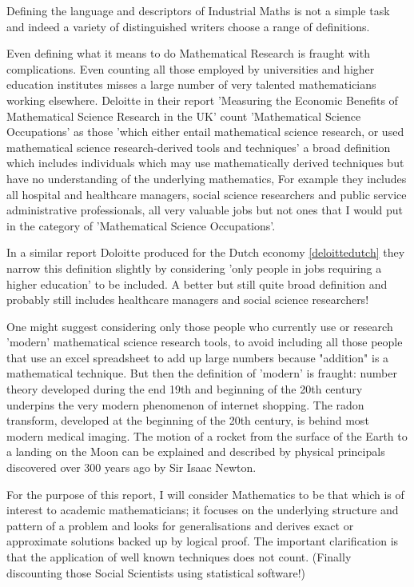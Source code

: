 \documentclass[11pt]{article} %
\begin{document}
	Defining the language and descriptors of  Industrial Maths is not a simple task and indeed a variety of distinguished writers choose a range of definitions. 
	
	Even defining what it means to do Mathematical Research is fraught with complications. Even counting all those employed by universities and higher education institutes misses a large number of very talented mathematicians working elsewhere. 	Deloitte in their report 'Measuring the Economic Benefits of Mathematical Science Research in the UK' \cite{deloitteuk} count 'Mathematical Science Occupations' as those 'which either entail mathematical science research, or used mathematical science research-derived tools and techniques' a broad definition which includes individuals which may use mathematically derived techniques but have no understanding of the underlying mathematics, For example they includes all hospital and healthcare managers, social science researchers and public service administrative professionals, all very valuable jobs but not ones that I would put in the category of 'Mathematical Science Occupations'. 
	
	
	In a similar report Doloitte produced for the Dutch economy \ref{deloittedutch} they narrow this definition slightly by considering 'only people in jobs requiring a higher education' to be included.  A better but still quite broad definition and probably still includes healthcare managers and social science researchers!
	
	
	One might suggest considering only those people who currently use or research 'modern' mathematical science research tools, to avoid including all those people that use an excel spreadsheet to add up large numbers because "addition" is a mathematical technique. But then the definition of 'modern' is fraught: number theory developed during the end 19th and beginning of the 20th century underpins the very modern phenomenon of internet shopping. The radon transform, developed at the beginning of the 20th century, is behind most modern medical imaging. The motion of a rocket from the surface of the Earth to a landing on the Moon can be explained and described by physical principals discovered over 300 years ago by Sir Isaac Newton.
	
	
	For the purpose of this report, I  will consider Mathematics to be that which is of interest to academic mathematicians; it focuses  on the underlying structure and pattern of a problem and  looks for generalisations and derives exact or approximate solutions backed up by logical proof. The important clarification is that the application of well known techniques does not count. (Finally discounting those Social Scientists using statistical software!)
	
\end{document}
